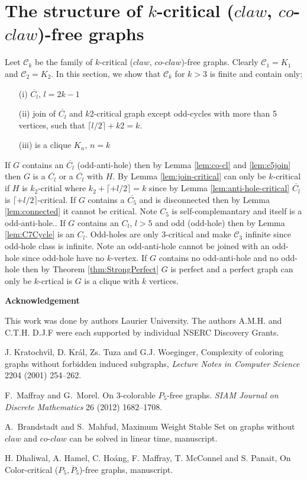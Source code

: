 \documentclass[12pt]{article}
\def\CCO{($claw$, $co$-$claw$)}
\begin{document}
\section{The structure of $k$-critical {\CCO}-free graphs}\label{sec:characterization}
%
Leet $\mathcal{C}_k$ be the family of $k$-critical {\CCO}-free graphs. Clearly $\mathcal{C}_1 = {K_1}$ and $\mathcal{C}_2 = {K_2}$.
In this section, we show that $\mathcal{C}_k$ for $k > 3$ is finite and contain only:
\begin{itemize}
\item[(i)]
$\overline{C_l}$, $l = 2k-1$
\item[(ii)]
join of $\overline{C_l}$ and $k2$-critical graph except odd-cycles with more than 5 vertices, such that  $\lceil l/2 \rceil + k2 = k$.
\item[(iii)]
is a clique $K_n$, $n = k$
\end{itemize} 
 If $G$ contains an $\overline{C_l}$ (odd-anti-hole) then by Lemma \ref{lem:co-cl} and \ref{lem:c5join} then $G$ is a $\overline{C_l}$ or a $\overline{C_l}$ with $H$. By Lemma \ref{lem:join-critical} can only be $k$-critical if $H$ is $k_2$-critial where $k_2 + \lceil + l/2 \rceil = k$ since by Lemma \ref{lem:anti-hole-critical} $\overline{C_l}$ is $\lceil + l/2 \rceil$-critical. If $G$ contains a $\overline{C_5}$ and is disconnected then by Lemma \ref{lem:connected} it cannot be critical. Note $C_5$ is self-complemantary and itself is a odd-anti-hole.. If $G$ contains an $C_l$, $l >5$ and odd (odd-hole) then by Lemma \ref{lem:C7Cycle} is an $C_l$. Odd-holes are only 3-critical and make $\mathcal{C}_3$ infinite since odd-hole class is infinite. Note an odd-anti-hole cannot be joined with an odd-hole since odd-hole have no $k$-vertex. If $G$ contains no odd-anti-hole and no odd-hole then by Theorem \ref{thm:StrongPerfect} $G$ is perfect and a perfect graph can only be $k$-crtical is $G$ is a clique with $k$ vertices.

\begin{center}
{\bf Acknowledgement}
\end{center}
This work was done by authors  Laurier University.  The authors A.M.H. and C.T.H. D.J.F were each supported by individual NSERC Discovery Grants.


\clearpage
\begin{thebibliography}{99}

     J. Kratochv\'{\i}l, D. Kr\'al, Zs. Tuza and G.J. Woeginger,
     Complexity of coloring graphs without forbidden induced subgraphs,
     {\sl Lecture Notes in Computer Science} 2204 (2001) 254--262.

    F.~Maffray and G.~Morel.  On $3$-colorable $P_5$-free graphs.  {\sl SIAM
     Journal on Discrete Mathematics} 26 (2012) 1682--1708.

  A.~Brandstadt and S.~Mahfud, Maximum Weight Stable Set on graphs without $claw$ and $co$-$claw$ can be solved in linear time, manuscript.

  H. Dhaliwal, A. Hamel, C. Ho\'{a}ng, F. Maffray, T. McConnel and S. Panait, On Color-critical ($P_5, \overline{P}_5$)-free graphs, manuscript.

\end{thebibliography}
\end{document}
